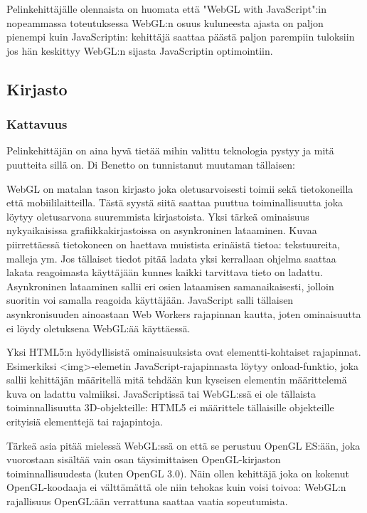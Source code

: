 Pelinkehittäjälle olennaista on huomata että "WebGL with JavaScript":in nopeammassa toteutuksessa WebGL:n osuus kuluneesta ajasta on paljon pienempi kuin JavaScriptin: kehittäjä saattaa päästä paljon parempiin tuloksiin jos hän keskittyy WebGL:n sijasta JavaScriptin optimointiin.  

\subsection{Kirjasto}

\subsubsection{Kattavuus}

Pelinkehittäjän on aina hyvä tietää mihin valittu teknologia pystyy ja mitä puutteita sillä on. Di Benetto\cite{dibenedettoSpider} on tunnistanut muutaman tällaisen:

WebGL on matalan tason kirjasto joka oletusarvoisesti toimii sekä tietokoneilla että mobiililaitteilla. Tästä syystä siitä saattaa puuttua toiminallisuutta joka löytyy oletusarvona suuremmista kirjastoista.
Yksi tärkeä ominaisuus nykyaikaisissa grafiikkakirjastoissa on asynkroninen lataaminen. Kuvaa piirrettäessä tietokoneen on haettava muistista erinäistä tietoa: tekstuureita, malleja ym. Jos tällaiset tiedot pitää ladata yksi kerrallaan ohjelma saattaa lakata reagoimasta käyttäjään kunnes kaikki tarvittava tieto on ladattu. Asynkroninen lataaminen sallii eri osien lataamisen samanaikaisesti, jolloin suoritin voi samalla reagoida käyttäjään. JavaScript salli tällaisen asynkronisuuden ainoastaan Web Workers rajapinnan kautta\cite{htmlwebworkers}, joten ominaisuutta ei löydy oletuksena WebGL:ää käyttäessä.

Yksi HTML5:n hyödyllisistä ominaisuuksista ovat elementti-kohtaiset rajapinnat. Esimerkiksi <img>-elemetin JavaScript-rajapinnasta löytyy onload-funktio, joka sallii kehittäjän määritellä mitä tehdään kun kyseisen elementin määrittelemä kuva on ladattu valmiiksi. JavaScriptissä tai WebGL:ssä ei ole tällaista toiminnallisuutta 3D-objekteille: HTML5 ei määrittele tällaisille objekteille erityisiä elementtejä tai rajapintoja.

Tärkeä asia pitää mielessä WebGL:ssä on että se perustuu OpenGL ES:ään, joka vuorostaan sisältää vain osan täysimittaisen OpenGL-kirjaston toiminnallisuudesta (kuten OpenGL 3.0)\cite{khronosopenwebgldiff}. Näin ollen kehittäjä joka on kokenut OpenGL-koodaaja ei välttämättä ole niin tehokas kuin voisi toivoa: WebGL:n rajallisuus OpenGL:ään verrattuna saattaa vaatia sopeutumista.

